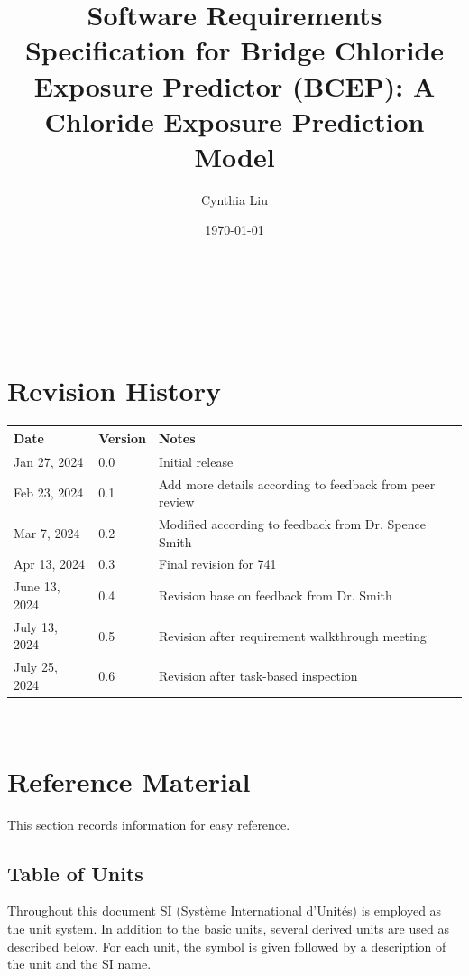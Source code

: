 \documentclass[12pt]{article}
\begin{document}
\title{Software Requirements Specification for Bridge Chloride Exposure Predictor (BCEP): A Chloride Exposure Prediction Model} 
\author{Cynthia Liu}
\date{\today}
	
\maketitle

~\newpage


\tableofcontents

~\newpage

\section*{Revision History}

\begin{tabularx}{\textwidth}{p{3cm}p{2cm}X}
\toprule {\bf Date} & {\bf Version} & {\bf Notes}\\
\midrule
Jan 27, 2024 & 0.0 & Initial release\\
Feb 23, 2024 & 0.1 & Add more details according to feedback from peer review\\
Mar 7, 2024 & 0.2 & Modified according to feedback from Dr. Spence Smith\\
Apr 13, 2024 & 0.3 & Final revision for 741\\
June 13, 2024 & 0.4 & Revision base on feedback from Dr. Smith\\
July 13, 2024 & 0.5 & Revision after requirement walkthrough meeting\\
July 25, 2024 & 0.6 & Revision after task-based inspection\\
\bottomrule
\end{tabularx}

~\newpage

\section{Reference Material}

This section records information for easy reference.

\subsection{Table of Units}

Throughout this document SI (Syst\`{e}me International d'Unit\'{e}s) is employed
as the unit system.  In addition to the basic units, several derived units are
used as described below.  For each unit, the symbol is given followed by a
description of the unit and the SI name.
~\newline
\end{document}
